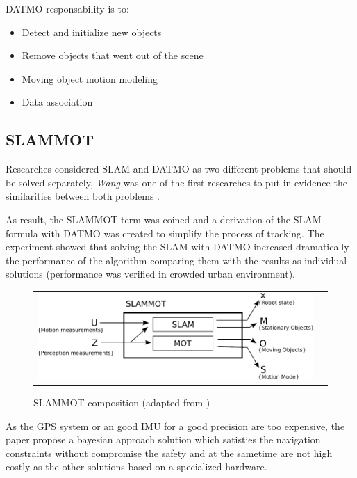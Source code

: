 DATMO responsability is to:

\begin{itemize}
\item Detect and initialize new objects
\item Remove objects that went out of the scene
\item Moving object motion modeling
\item Data association
\end{itemize}



\subsection{SLAMMOT}

Researches considered SLAM and DATMO as two different problems that should be solved separately, \textit{Wang} was one of the first researches to put in evidence the similarities between both problems \cite{Wang03onlinesimultaneous}.

As result, the SLAMMOT term was coined and a derivation of the SLAM formula with DATMO was created to simplify the process of tracking. The experiment showed that solving the SLAM with DATMO increased dramatically the performance of the algorithm comparing them with the results as individual solutions (performance was verified in crowded urban environment).

\begin{figure}[h]
   \centering
     \begin{tabular}{lr}
       \includegraphics[scale=0.9]{img/fig:slammot}
     \end{tabular}
   \caption{SLAMMOT composition (adapted from \cite{Wang04a})}
   \label{fig:slammot}
 \end{figure}

As the GPS system or an good IMU for a good precision are too expensive, the paper propose a bayesian approach solution which satisties the navigation constraints without compromise the safety and at the sametime are not high costly as the other solutions based on a specialized hardware.

